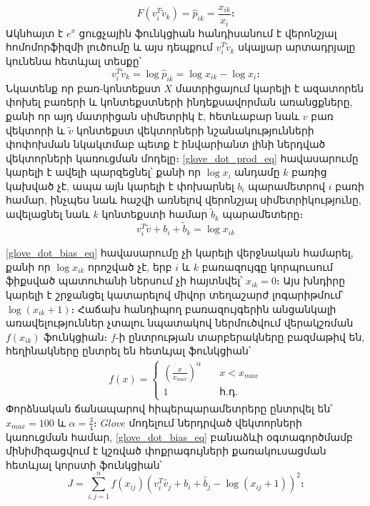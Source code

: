 \documentclass[11pt]{article}
\begin{document}
 \begin{equation}
 F(v_i^T\widetilde{v}_k) = \hat p_{ik} = \frac{x_{ik}}{x_i}։
  \end{equation}
 Ակնհայտ է $e^x$ ցուցչային ֆունկցիան հանդիսանում է վերոնշյալ հոմոմորֆիզմի լուծումը և այս դեպքում $v_i^T\widetilde{v}_k$ սկալյար արտադրյալը կունենա հետևյալ տեսքը՝
 \begin{equation}
 v_i^T\widetilde{v}_k = \log \hat p_{ik} = \log x_{ik} - \log x_i։
 \label{glove_dot_prod_eq}
 \end{equation}
 Նկատենք որ բառ-կոնտեքստ $X$ մատրիցայում կարելի է ազատորեն փոխել բառերի և կոնտեքստների  ինդեքսավորման առանցքները, քանի որ այդ մատրիցան սիմետրիկ է, հետևաբար նաև $v$ բառ վեկտորի և $\widetilde{v}$ կոնտեքստ վեկտորների նշանակությունների փոփոխման նկակտմաբ պետք է ինվարիանտ լինի ներդված վեկտորների կառուցման մոդելը։ \ref{glove_dot_prod_eq} հավասարումը կարելի է ավելի պարզեցնել՝ քանի որ $\log x_i$ անդամը $k$ բառից կախված չէ, ապա այն կարելի է փոխարնել $b_i$ պարամետրով $i$ բառի համար, ինչպես նաև հաշվի առնելով վերոնշյալ սիմետրիկությունը, ավելացնել նաև $k$ կոնտեքստի համար $\widetilde{b}_k$ պարամետերը։
 \begin{equation}
v_i^T \widetilde{v} + b_i + \widetilde{b}_k = \log x_{ik}
\label{glove_dot_bias_eq}
\end{equation}

\ref{glove_dot_bias_eq} հավասարումը չի կարելի վերջնական համարել, քանի որ $\log x_{ik}$ որոշված չէ, երբ $i$ և $k$ բառազույգը կորպուսում ֆիքսված պատուհանի ներսում չի հայտնվել՝ $x_{ik} =0$։ Այս խնդիրը կարելի է շրջանցել կատարելով միվոր տեղաշարժ լոգարիթմում՝ $\log \left(x_{ik} + 1\right)։$ Հաճախ հանդիպող բառազույգերին անցանկալի առավելություններ չտալու նպատակով ներմուծվում վերակշռման $f(x_{ik})$ ֆունկցիան։ $f$-ի ընտրության տարբերակները բազմաթիվ են, հեղինակները ընտրել են հետևյալ ֆունկցիան՝ 
 \begin{align}
 f(x) = \begin{cases}
\left ( \frac{x}{x_{max}} \right)^\alpha & \quad x < x_{max} \\
1 & \quad \text{հ.դ.}
 \end{cases}
 \end{align}
 Փորձնական ճանապարով հիպերպարամետրերը ընտրվել են՝  $x_{max} = 100$ և $\alpha = \frac{3}{4}$։ 
$Glove$ մոդելում ներդրված վեկտորների կառուցման համար, \ref{glove_dot_bias_eq} բանաձևի օգտագործմամբ մինիմիզացվում է կշռված փոքրագույների քառակուսացման հետևյալ կորստի  ֆունկցիան՝
\begin{equation}
J = \sum_{i,j=1}^{n}{f(x_{ij})(v_i^T\widetilde{v_j}+b_i+\widetilde{b_j} - \log(x_{ij} + 1))^2}։
\label{glove_opt_eq}
\end{equation}
\end{document}
